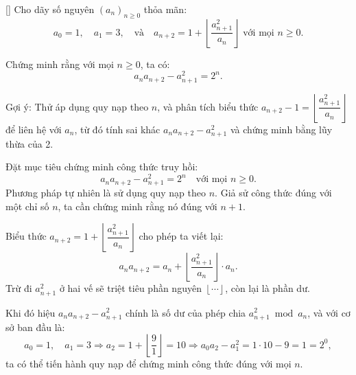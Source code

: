 \documentclass[../04-diophantine-equations.tex]{subfiles}
\begin{document}
\begin{exercise*}\label{example:GBR-2015-TST-F1-P2}[\textbf{}]
    Cho dãy số nguyên \( (a_n)_{n \ge 0} \) thỏa mãn:
    \[
        a_0 = 1, \quad a_1 = 3, \quad \text{và} \quad a_{n+2} = 1 + \left\lfloor \frac{a_{n+1}^2}{a_n} \right\rfloor \text{ với mọi } n \ge 0.
    \]
    
    Chứng minh rằng với mọi \(n \ge 0\), ta có:
    \[
        a_n a_{n+2} - a_{n+1}^2 = 2^n.
    \]
\end{exercise*}

\begin{remark*}
    Gợi ý: Thử áp dụng quy nạp theo \(n\), và phân tích biểu thức \(a_{n+2} - 1 = \left\lfloor \dfrac{a_{n+1}^2}{a_n} \right\rfloor\) để liên hệ với \(a_n\),
    từ đó tính sai khác \(a_n a_{n+2} - a_{n+1}^2\) và chứng minh bằng lũy thừa của 2.
\end{remark*}

\begin{story*}
    Đặt mục tiêu chứng minh công thức truy hồi:
    \[
        a_n a_{n+2} - a_{n+1}^2 = 2^n \quad \text{với mọi } n \ge 0.
    \]
    Phương pháp tự nhiên là sử dụng quy nạp theo \(n\). Giả sử công thức đúng với một chỉ số \(n\), ta cần chứng minh rằng nó đúng với \(n+1\).

    Biểu thức \(a_{n+2} = 1 + \left\lfloor \dfrac{a_{n+1}^2}{a_n} \right\rfloor\) cho phép ta viết lại:
    \[
        a_n a_{n+2} = a_n + \left\lfloor \dfrac{a_{n+1}^2}{a_n} \right\rfloor \cdot a_n.
    \]
    Trừ đi \(a_{n+1}^2\) ở hai vế sẽ triệt tiêu phần nguyên \( \left\lfloor \cdots \right\rfloor \), còn lại là phần dư.

    Khi đó hiệu \(a_n a_{n+2} - a_{n+1}^2\) chính là số dư của phép chia \(a_{n+1}^2 \bmod a_n\), và với cơ sở ban đầu là:
    \[
        a_0 = 1, \quad a_1 = 3 \Rightarrow a_2 = 1 + \left\lfloor \dfrac{9}{1} \right\rfloor = 10 \Rightarrow a_0 a_2 - a_1^2 = 1 \cdot 10 - 9 = 1 = 2^0,
    \]
    ta có thể tiến hành quy nạp để chứng minh công thức đúng với mọi \(n\).
\end{story*}
\end{document}
